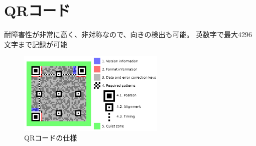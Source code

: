 \section{QRコード}
耐障害性が非常に高く、非対称なので、向きの検出も可能。
英数字で最大4296文字まで記録が可能

\begin{figure}[htbp]
    \begin{center}
        \includegraphics[clip,width=7.0cm]{img/qrcode.png}
        \caption{QRコードの仕様}
    \end{center}
\end{figure}